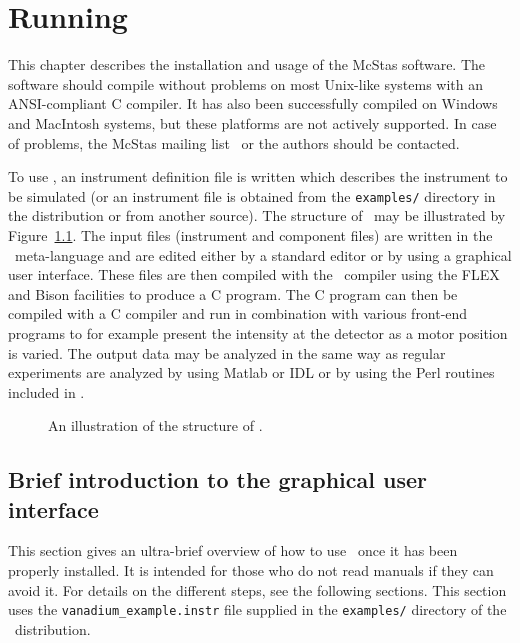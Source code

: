 
\chapter{Running \MCS}

This chapter describes the installation and usage of the McStas software.
The software should compile without problems on most Unix-like
systems with an ANSI-compliant C compiler. It has also been successfully
compiled on Windows and MacIntosh systems, but these platforms are
not actively supported. In case of problems, the McStas
mailing list~\cite{mcstas_webpage} or the authors should be contacted.

To use \MCS , an instrument
definition file is written which describes the instrument to be simulated (or
an instrument file is obtained from the \verb+examples/+ directory in the
distribution or from another source). 
The structure of \MCS\ may be illustrated by Figure~\ref{fig:structure}.
The input files (instrument and component files) are written in the \MCS\
meta-language and are edited either by a standard editor or by using a 
graphical user interface. These files are 
then compiled with
the \MCS\ compiler using the FLEX and Bison facilities to produce a C program. 
The C program can then be
compiled with a C compiler and run in combination with various front-end programs to for
example present the intensity at the detector as a motor position is varied.
The output data may be analyzed in the same way as regular experiments are analyzed
by using Matlab or IDL or by using the Perl routines included in \MCS .

\begin{figure}[th]
\begin{center}

\end{center}
\caption{An illustration of the structure of \MCS .}
\label{fig:structure}
\end{figure}

\section{Brief introduction to the graphical user interface}
\label{s:brief}

This section gives an ultra-brief overview of how to use \MCS\ once it
has been properly installed. It is intended for those who do not read
manuals if they can avoid it. For details on the different steps, see
the following sections. This section uses the
\verb+vanadium_example.instr+ file supplied in the \verb+examples/+
directory of the \MCS\ distribution. %

